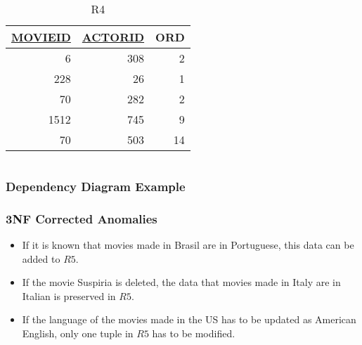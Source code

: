 \documentclass[dvipsnames]{beamer}
\begin{document}
\begin{frame}
\begin{example}
\begin{columns}[t]
      \begin{tiny}
      \begin{table}
        \caption{R4}
        \begin{tabular}{|r|r|r|}\hline
\underline{MOVIEID} & \underline{ACTORID} & ORD\\\hline\hline
   6 & 308 &  2\\\hline
 228 &  26 &  1\\\hline
  70 & 282 &  2\\\hline
1512 & 745 &  9\\\hline
  70 & 503 & 14\\\hline
        \end{tabular}
      \end{table}
      \end{tiny}
    \end{columns}
  \end{example}
\end{frame}

\begin{frame}
  \frametitle{Dependency Diagram Example}

  \begin{example}
    \begin{center}
    \end{center}
  \end{example}
 \end{frame}

\begin{frame}
  \frametitle{3NF Corrected Anomalies}

  \begin{example}
    \begin{itemize}
      \item If it is known that movies made in Brasil are in Portuguese, this
        data can be added to $R5$.

      \pause
      \item If the movie Suspiria is deleted, the data that movies made in Italy
        are in Italian is preserved in $R5$.

      \pause
      \item If the language of the movies made in the US has to be updated as
        American English, only one tuple in $R5$ has to be modified.
    \end{itemize}
  \end{example}
\end{frame}
\end{document}

